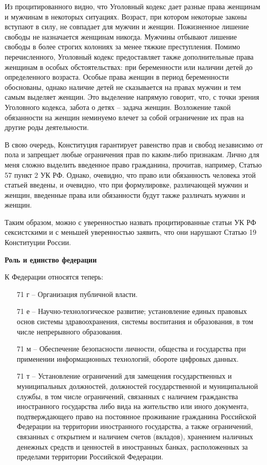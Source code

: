 \documentclass[a4paper, 12pt]{article}
\begin{document}
Из процитированного видно, что Уголовный кодекс дает разные права женщинам и мужчинам в некоторых ситуациях. 
Возраст, при котором некоторые законы вступают в силу, не совпадает для мужчин и женщин. 
Пожизненное лишение свободы не назначается женщинам никогда. 
Мужчины отбывают лишение свободы в более строгих колониях за менее тяжкие преступления. 
Помимо перечисленного, Уголовный кодекс предоставляет также дополнительные права женщинам в особых обстоятельствах: при беременности или наличии детей до определенного возраста. 
Особые права женщин в период беременности обоснованы, однако наличие детей не сказывается на правах мужчин и тем самым выделяет женщин. 
Это выделение напрямую говорит, что, с точки зрения Уголовного кодекса, забота о детях -- задача женщин. 
Возложение такой обязанности на женщин неминуемо влечет за собой ограничение их прав на другие роды деятельности. 

В свою очередь, Конституция гарантирует равенство прав и свобод независимо от пола и запрещает любые ограничения прав по каким-либо признакам. 
Лично для меня сложно выделить введенное право гражданина, прочитав, например, Статью 57 пункт 2 УК РФ. 
Однако, очевидно, что право или обязанность человека этой статьей введены, и очевидно, что при формулировке, различающей мужчин и женщин, введенные права или обязанности будут также различать мужчин и женщин. 

Таким образом, можно с уверенностью назвать процитированные статьи УК РФ сексистскими и с меньшей уверенностью заявить, что они нарушают Статью 19 Конституции России. 



\newpage
\begin{center}\bf
Роль и единство федерации
\end{center}

К Федерации относятся теперь:
\begin{itemize}
\item[71 г --] Организация публичной власти. 
\item[71 е --] Научно-технологическое развитие; установление единых правовых основ системы здравоохранения, системы воспитания и образования, в том числе непрерывного образования. 
\item[71 м --] Обеспечение безопасности личности, общества и государства при применении информационных технологий, обороте цифровых данных. 
\item[71 т --] Установление ограничений для замещения государственных и муниципальных должностей, должностей государственной и муниципальной службы, в том числе ограничений, связанных с наличием гражданства иностранного государства либо вида на жительство или иного документа, подтверждающего право на постоянное проживание гражданина Российской Федерации на территории иностранного государства, а также ограничений, связанных с открытием и наличием счетов (вкладов), хранением наличных денежных средств и ценностей в иностранных банках, расположенных за пределами территории Российской Федерации.
\end{itemize}
\end{document}
